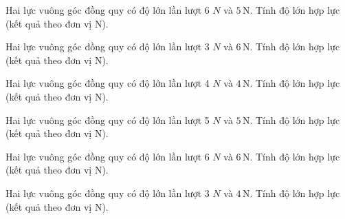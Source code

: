 \begin{ex}
Hai lực vuông góc đồng quy có độ lớn lần lượt 6 $N$ và $5\,\text{N}$. Tính độ lớn hợp lực (kết quả theo đơn vị N).
\end{ex}

\begin{ex}
Hai lực vuông góc đồng quy có độ lớn lần lượt 3 $N$ và $6\,\text{N}$. Tính độ lớn hợp lực (kết quả theo đơn vị N).
\end{ex}

\begin{ex}
Hai lực vuông góc đồng quy có độ lớn lần lượt 4 $N$ và $4\,\text{N}$. Tính độ lớn hợp lực (kết quả theo đơn vị N).
\end{ex}

\begin{ex}
Hai lực vuông góc đồng quy có độ lớn lần lượt 5 $N$ và $5\,\text{N}$. Tính độ lớn hợp lực (kết quả theo đơn vị N).
\end{ex}

\begin{ex}
Hai lực vuông góc đồng quy có độ lớn lần lượt 6 $N$ và $6\,\text{N}$. Tính độ lớn hợp lực (kết quả theo đơn vị N).
\end{ex}

\begin{bt}
Hai lực vuông góc đồng quy có độ lớn lần lượt 3 $N$ và $4\,\text{N}$. Tính độ lớn hợp lực (kết quả theo đơn vị N).
\end{bt}

